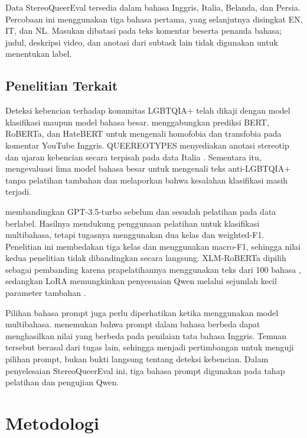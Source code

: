 \documentclass[11pt]{article}
\begin{document}
Data StereoQueerEval tersedia dalam bahasa Inggris, Italia, Belanda, dan Persia. Percobaan ini menggunakan tiga bahasa pertama, yang selanjutnya disingkat EN, IT, dan NL. Masukan dibatasi pada teks komentar beserta penanda bahasa; judul, deskripsi video, dan anotasi dari subtask lain tidak digunakan untuk menentukan label.

\subsection{Penelitian Terkait}
Deteksi kebencian terhadap komunitas LGBTQIA+ telah dikaji dengan model klasifikasi maupun model bahasa besar. \citet{nozza-2022-nozza} menggabungkan prediksi BERT, RoBERTa, dan HateBERT untuk mengenali homofobia dan transfobia pada komentar YouTube Inggris. QUEEREOTYPES menyediakan anotasi stereotip dan ujaran kebencian secara terpisah pada data Italia \citep{cignarella-etal-2024-queereotypes}. Sementara itu, \citet{nguyen-etal-2025-leveraging} mengevaluasi lima model bahasa besar untuk mengenali teks anti-LGBTQIA+ tanpa pelatihan tambahan dan melaporkan bahwa kesalahan klasifikasi masih terjadi.

\citet{chan-etal-2024-hate} membandingkan GPT-3.5-turbo sebelum dan sesudah pelatihan pada data berlabel. Hasilnya mendukung penggunaan pelatihan untuk klasifikasi multibahasa, tetapi tugasnya menggunakan dua kelas dan weighted-F1. Penelitian ini membedakan tiga kelas dan menggunakan macro-F1, sehingga nilai kedua penelitian tidak dibandingkan secara langsung. XLM-RoBERTa dipilih sebagai pembanding karena prapelatihannya menggunakan teks dari 100 bahasa \citep{conneau-etal-2020-unsupervised}, sedangkan LoRA memungkinkan penyesuaian Qwen melalui sejumlah kecil parameter tambahan \citep{hu-etal-2021-lora}.

Pilihan bahasa prompt juga perlu diperhatikan ketika menggunakan model multibahasa. \citet{behzad-etal-2024-ask} menemukan bahwa prompt dalam bahasa berbeda dapat menghasilkan nilai yang berbeda pada penilaian tata bahasa Inggris. Temuan tersebut berasal dari tugas lain, sehingga menjadi pertimbangan untuk menguji pilihan prompt, bukan bukti langsung tentang deteksi kebencian. Dalam penyelesaian StereoQueerEval ini, tiga bahasa prompt digunakan pada tahap pelatihan dan pengujian Qwen.

\section{Metodologi}
\end{document}
